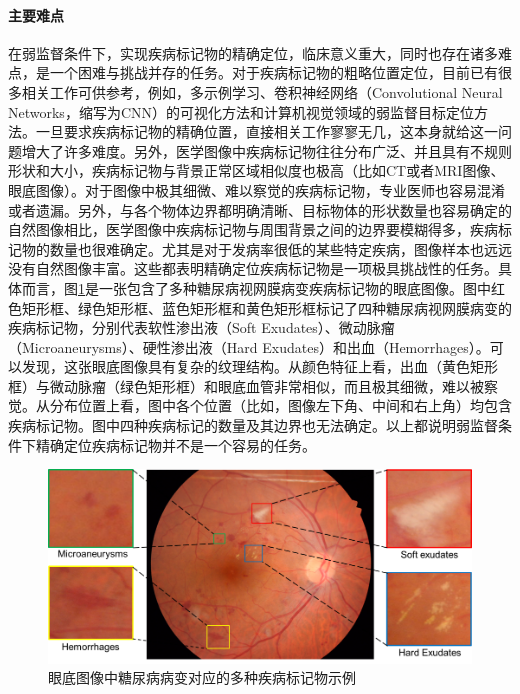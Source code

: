 \paragraph{主要难点} 在弱监督条件下，实现疾病标记物的精确定位，临床意义重大，同时也存在诸多难点，是一个困难与挑战并存的任务。对于疾病标记物的粗略位置定位，目前已有很多相关工作可供参考，例如，多示例学习、卷积神经网络（Convolutional Neural Networks，缩写为CNN）的可视化方法和计算机视觉领域的弱监督目标定位方法。一旦要求疾病标记物的精确位置，直接相关工作寥寥无几，这本身就给这一问题增大了许多难度。另外，医学图像中疾病标记物往往分布广泛、并且具有不规则形状和大小，疾病标记物与背景正常区域相似度也极高（比如CT或者MRI图像、眼底图像）。对于图像中极其细微、难以察觉的疾病标记物，专业医师也容易混淆或者遗漏。另外，与各个物体边界都明确清晰、目标物体的形状数量也容易确定的自然图像相比，医学图像中疾病标记物与周围背景之间的边界要模糊得多，疾病标记物的数量也很难确定。尤其是对于发病率很低的某些特定疾病，图像样本也远远没有自然图像丰富。这些都表明精确定位疾病标记物是一项极具挑战性的任务。具体而言，图\ref{fig:biomarker_localization_example}是一张包含了多种糖尿病视网膜病变疾病标记物的眼底图像。图中红色矩形框、绿色矩形框、蓝色矩形框和黄色矩形框标记了四种糖尿病视网膜病变的疾病标记物，分别代表软性渗出液（Soft Exudates）、微动脉瘤（Microaneurysms）、硬性渗出液（Hard Exudates）和出血（Hemorrhages）。可以发现，这张眼底图像具有复杂的纹理结构。从颜色特征上看，出血（黄色矩形框）与微动脉瘤（绿色矩形框）和眼底血管非常相似，而且极其细微，难以被察觉。从分布位置上看，图中各个位置（比如，图像左下角、中间和右上角）均包含疾病标记物。图中四种疾病标记的数量及其边界也无法确定。以上都说明弱监督条件下精确定位疾病标记物并不是一个容易的任务。
\begin{figure}[h]
	\centering
	\includegraphics[width=1.0\textwidth]{figure/biomarker_localization_example}
	\caption{眼底图像中糖尿病病变对应的多种疾病标记物示例} 
	\label{fig:biomarker_localization_example}
\end{figure}


